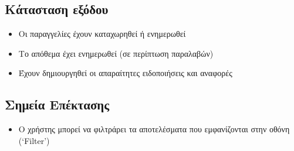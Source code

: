 \documentclass[12pt,a4paper,twoside]{book}
\begin{document}
\subsection{Κάτασταση εξόδου} %
\begin{itemize}
  \item Οι παραγγελίες έχουν καταχωρηθεί ή ενημερωθεί
  \item Το απόθεμα έχει ενημερωθεί (σε περίπτωση παραλαβών)
  \item Έχουν δημιουργηθεί οι απαραίτητες ειδοποιήσεις και αναφορές %
\end{itemize}

\subsection{Σημεία Επέκτασης}
\begin{itemize}
  \item Ο χρήστης μπορεί να φιλτράρει τα αποτελέσματα που εμφανίζονται στην οθόνη (`Filter') %
\end{itemize}



\end{document}
